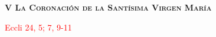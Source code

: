 \begin{center}
    \textbf{\textsc{V La Coronación de la Santísima Virgen María}}
    
    \textcolor{red}{Eccli 24, 5; 7, 9-11}    
\end{center}

